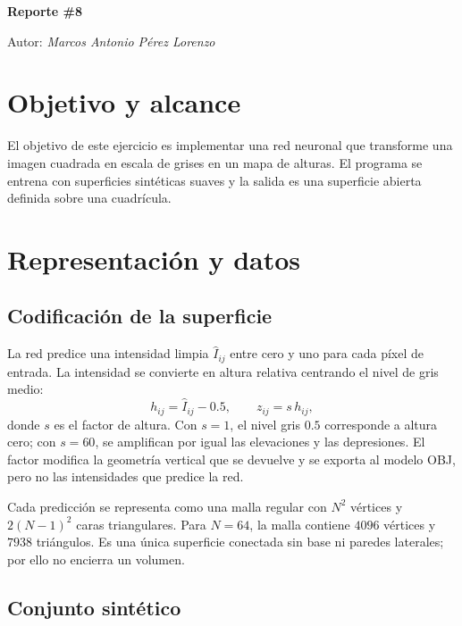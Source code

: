 \documentclass[12pt,a4paper]{article}
\begin{document}
\begin{titlepage}
  \centering
  {\huge\bfseries Reporte \#8\par}
  \vspace{1cm}
  {\Large Autor: \itshape Marcos Antonio Pérez Lorenzo\par}
\end{titlepage}

\pagebreak

\section{Objetivo y alcance}

El objetivo de este ejercicio es implementar una red neuronal que transforme una imagen cuadrada en escala de grises en un mapa de alturas. El programa se entrena con superficies sintéticas suaves y la salida es una superficie abierta definida sobre una cuadrícula.

\section{Representación y datos}

\subsection{Codificación de la superficie}

La red predice una intensidad limpia \(\widehat{I}_{ij}\) entre cero y uno para cada píxel de entrada. La intensidad se convierte en altura relativa centrando el nivel de gris medio:
\begin{equation}
  h_{ij}=\widehat{I}_{ij}-0.5,
  \qquad
  z_{ij}=s\,h_{ij},
  \label{eq:height-encoding}
\end{equation}
donde \(s\) es el factor de altura. Con \(s=1\), el nivel gris \(0.5\) corresponde a altura cero; con \(s=60\), se amplifican por igual las elevaciones y las depresiones. El factor modifica la geometría vertical que se devuelve y se exporta al modelo OBJ, pero no las intensidades que predice la red.

Cada predicción se representa como una malla regular con \(N^2\) vértices y \(2(N-1)^2\) caras triangulares. Para \(N=64\), la malla contiene \(4096\) vértices y \(7938\) triángulos. Es una única superficie conectada sin base ni paredes laterales; por ello no encierra un volumen.

\subsection{Conjunto sintético}
\end{document}
